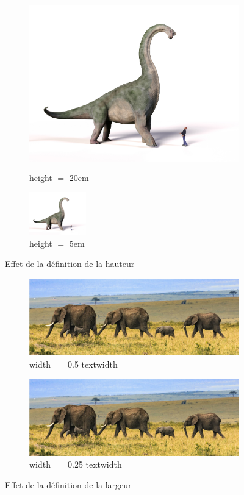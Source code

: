 \documentclass[a4paper, 13pt]{report} %
\begin{document}
			\begin{figure}[h!]\centering
				\begin{subfigure}{.49\linewidth}\centering
					\includegraphics[height=20em]{dimensions/dinosaure.jpg}
					\caption{height $=$ \num{20}em}
				\end{subfigure}\hfill
				\begin{subfigure}{.49\linewidth}\centering
					\includegraphics[height=5em]{dimensions/dinosaure.jpg}
					\caption{height $=$ \num{5}em}
				\end{subfigure}
				\caption{Effet de la définition de la hauteur}
			\end{figure}
			\begin{figure}[h!]\centering
				\begin{subfigure}{.49\linewidth}\centering
					\includegraphics[width=\textwidth]{dimensions/elephants.jpg}
					\caption{width $=$ \num{0.5} textwidth}
				\end{subfigure}\hfill
				\begin{subfigure}{.49\linewidth}\centering
					\includegraphics[width=.5\textwidth]{dimensions/elephants.jpg}
					\caption{width $=$ \num{0.25} textwidth}
				\end{subfigure}
				\caption{Effet de la définition de la largeur}
			\end{figure}
\end{document}
